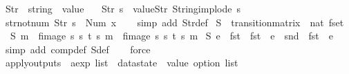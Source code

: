 \begin{isabellebody}
\isanewline
{}\isamarkupfalse%
\ Str\ {\isacharcolon}{\isacharcolon}\ {\isachardoublequoteopen}string\ {\isasymRightarrow}\ value{\isachardoublequoteclose}\ \isanewline
\ \ {\isachardoublequoteopen}Str\ s\ {\isasymequiv}\ value{\isachardot}Str\ {\isacharparenleft}String{\isachardot}implode\ s{\isacharparenright}{\isachardoublequoteclose}\isanewline
\isanewline
{}\isamarkupfalse%
\ str{\isacharunderscore}not{\isacharunderscore}num{\isacharcolon}\ {\isachardoublequoteopen}Str\ s\ {\isasymnoteq}\ Num\ x{}{\isachardoublequoteclose}\isanewline
%
\isadelimproof
\ \ %
\endisadelimproof
%
\isatagproof
{}\isamarkupfalse%
\ {\isacharparenleft}simp\ add{\isacharcolon}\ Str{\isacharunderscore}def{\isacharparenright}%
\endisatagproof
{\isafoldproof}%
%
\isadelimproof
\isanewline
%
\endisadelimproof
\isanewline
{}\isamarkupfalse%
\ S\ {\isacharcolon}{\isacharcolon}\ {\isachardoublequoteopen}transition{\isacharunderscore}matrix\ {\isasymRightarrow}\ nat\ fset{\isachardoublequoteclose}\ \isanewline
\ \ {\isachardoublequoteopen}S\ m\ {\isacharequal}\ {\isacharparenleft}fimage\ {\isacharparenleft}{\isasymlambda}{\isacharparenleft}{\isacharparenleft}s{\isacharcomma}\ s{\isacharprime}{\isacharparenright}{\isacharcomma}\ t{\isacharparenright}{\isachardot}\ s{\isacharparenright}\ m{\isacharparenright}\ {\isacharbar}{\isasymunion}{\isacharbar}\ fimage\ {\isacharparenleft}{\isasymlambda}{\isacharparenleft}{\isacharparenleft}s{\isacharcomma}\ s{\isacharprime}{\isacharparenright}{\isacharcomma}\ t{\isacharparenright}{\isachardot}\ s{\isacharprime}{\isacharparenright}\ m{\isachardoublequoteclose}\isanewline
\isanewline
{}\isamarkupfalse%
\ {\isachardoublequoteopen}S\ e\ {\isacharequal}\ {\isacharparenleft}fst\ {\isasymcirc}\ fst{\isacharparenright}\ {\isacharbar}{\isacharbackquote}{\isacharbar}\ e\ {\isacharbar}{\isasymunion}{\isacharbar}\ {\isacharparenleft}snd\ {\isasymcirc}\ fst{\isacharparenright}\ {\isacharbar}{\isacharbackquote}{\isacharbar}\ e{\isachardoublequoteclose}\isanewline
%
\isadelimproof
\ \ %
\endisadelimproof
%
\isatagproof
{}\isamarkupfalse%
\ {\isacharparenleft}simp\ add{\isacharcolon}\ comp{\isacharunderscore}def\ S{\isacharunderscore}def{\isacharparenright}\isanewline
\ \ \isamarkupfalse%
\ force%
\endisatagproof
{\isafoldproof}%
%
\isadelimproof
\isanewline
%
\endisadelimproof
\isanewline
{}\isamarkupfalse%
\ apply{\isacharunderscore}outputs\ {\isacharcolon}{\isacharcolon}\ {\isachardoublequoteopen}aexp\ list\ {\isasymRightarrow}\ datastate\ {\isasymRightarrow}\ value\ option\ list{\isachardoublequoteclose}\ \isanewline

\end{isabellebody}
